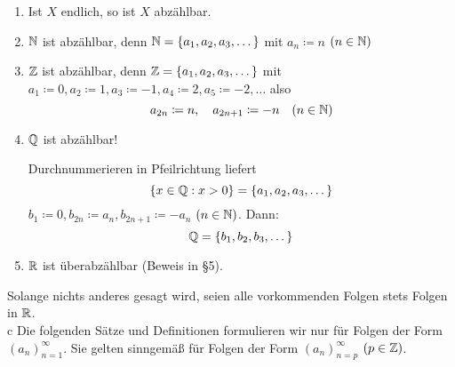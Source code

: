 \begin{beispiele*}
	\begin{enumerate}
		\item Ist $X$ endlich, so ist $X$ abzählbar.
		\item $\mathbb{N}$ ist abzählbar, denn $\mathbb{N} = \{ a_{1}, a_{2}, a_{3}, \dotsc \}$ mit $a_{n} \coloneqq n$ $(n \in \mathbb{N})$
		\item $\mathbb{Z}$ ist abzählbar, denn $\mathbb{Z} = \{ a_{1}, a_{2}, a_{3}, \dotsc \}$ mit $a_{1} \coloneqq 0, a_{2} \coloneqq 1, a_{3} \coloneqq -1, a_{4} \coloneqq 2, a_{5} \coloneqq -2, \dotsc$ also
			$$ a_{2n} \coloneqq n, \quad a_{2n + 1} \coloneqq -n \quad (n \in \mathbb{N}) $$
		\item $\mathbb{Q}$ ist abzählbar!
			\begin{center}
			\end{center}
			Durchnummerieren in Pfeilrichtung liefert
				$$ \{ x \in \mathbb{Q} : x > 0 \} = \{ a_{1}, a_{2}, a_{3}, \dotsc \} $$
			$b_{1} \coloneqq 0, b_{2n} \coloneqq a_{n}, b_{2n + 1} \coloneqq - a_{n}$ $(n \in \mathbb{N})$. Dann:
			$$ \mathbb{Q} = \{ b_{1}, b_{2}, b_{3}, \dotsc \} $$
		\item $\mathbb{R}$ ist überabzählbar (Beweis in \S 5).
	\end{enumerate}	
\end{beispiele*}


\begin{vereinbarung}
	Solange nichts anderes gesagt wird, seien alle vorkommenden Folgen stets Folgen in $\mathbb{R}$. \\                                                                                                  c
	Die folgenden Sätze und Definitionen formulieren wir nur für Folgen der Form $(a_{n})_{n=1}^{\infty}$. Sie gelten sinngemä{\ss} für Folgen der Form $(a_{n})_{n=p}^{\infty}$ $(p \in \mathbb{Z})$.
\end{vereinbarung}


